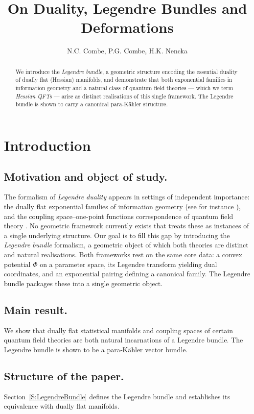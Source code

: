 \documentclass[12pt]{amsart}
\title{On Duality, Legendre Bundles and Deformations}
\author{N.C. Combe, P.G. Combe, H.K. Nencka }
\begin{document}
\maketitle
\begin{abstract}
    We introduce the \textit{Legendre bundle}, a geometric structure 
encoding the essential duality of dually flat (Hessian) manifolds, 
and demonstrate that both exponential families in information geometry 
and a natural class of quantum field theories --- which we term 
\textit{Hessian QFTs} --- arise as distinct realisations of this 
single framework. The Legendre bundle is shown to carry a canonical 
para-K\"ahler structure. 
\end{abstract}
\section{Introduction}
\subsection{Motivation and object of study.}
The formalism of {\it Legendre duality} appears in settings of independent importance: the dually flat exponential families of information geometry (see for instance \cite{CM,CCN,Ch}), and the coupling space–one-point functions correspondence of quantum field theory \cite{CV}. No geometric framework currently exists that treats these as instances of a single underlying structure. Our goal is to fill this gap by introducing the {\it Legendre bundle} formalism, a geometric object of which both theories are distinct and natural realisations. Both frameworks rest on the same core data: a convex potential $\Phi$ on a parameter space, its Legendre transform yielding dual coordinates, and an exponential pairing defining a canonical family. The Legendre bundle packages these into a single geometric object.

\subsection{Main result.}
We show that dually flat statistical manifolds and coupling spaces of certain quantum field theories are both natural incarnations of a Legendre bundle. The Legendre bundle is shown to be a para‑Kähler vector bundle.

\subsection{Structure of the paper.}
Section~\ref{S:LegendreBundle} defines the Legendre bundle and establishes its equivalence with dually flat manifolds. 
\end{document}
